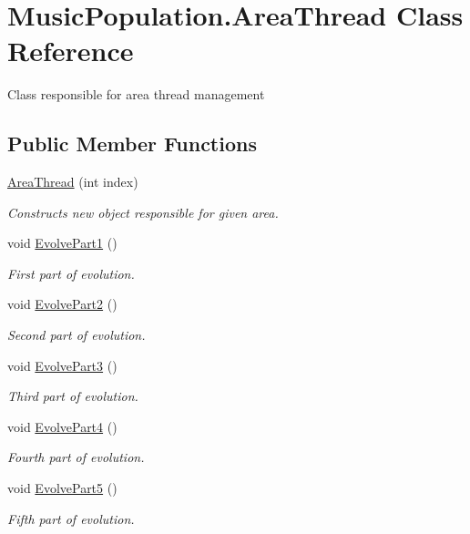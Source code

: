 \hypertarget{class_music_population_1_1_area_thread}{\section{Music\+Population.\+Area\+Thread Class Reference}
\label{class_music_population_1_1_area_thread}
}


Class responsible for area thread management  


\subsection*{Public Member Functions}
\begin{DoxyCompactItemize}
\item 
\hyperlink{class_music_population_1_1_area_thread_a83764cb07a09bfada3656fd3377d0aae}{Area\+Thread} (int index)
\begin{DoxyCompactList}\small\item\em Constructs new object responsible for given area. \end{DoxyCompactList}\item 
void \hyperlink{class_music_population_1_1_area_thread_a9098b4cc52c26764a28d58ceee033902}{Evolve\+Part1} ()
\begin{DoxyCompactList}\small\item\em First part of evolution. \end{DoxyCompactList}\item 
void \hyperlink{class_music_population_1_1_area_thread_ab0eb9479b65271d4e8647cbea10a3a90}{Evolve\+Part2} ()
\begin{DoxyCompactList}\small\item\em Second part of evolution. \end{DoxyCompactList}\item 
void \hyperlink{class_music_population_1_1_area_thread_ae24a83aeabfb8a254321c80097c0c17b}{Evolve\+Part3} ()
\begin{DoxyCompactList}\small\item\em Third part of evolution. \end{DoxyCompactList}\item 
void \hyperlink{class_music_population_1_1_area_thread_aa40d3faeccd473c84d31976b00ff3ec8}{Evolve\+Part4} ()
\begin{DoxyCompactList}\small\item\em Fourth part of evolution. \end{DoxyCompactList}\item 
void \hyperlink{class_music_population_1_1_area_thread_aa055713a70d3f4d4a22bfb482c8f884c}{Evolve\+Part5} ()
\begin{DoxyCompactList}\small\item\em Fifth part of evolution. \end{DoxyCompactList}\end{DoxyCompactItemize}


